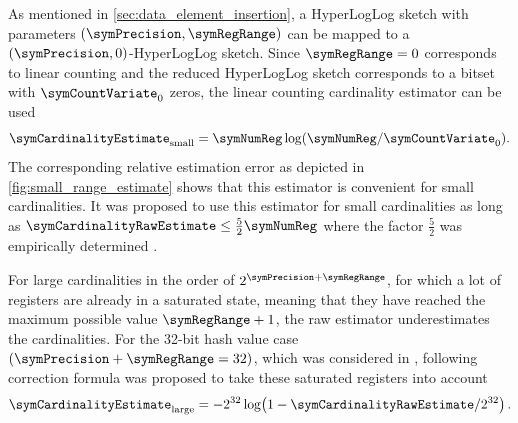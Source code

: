 \documentclass[a4paper]{scrartcl}
\begin{document}
As mentioned in \cref{sec:data_element_insertion}, a HyperLogLog sketch with parameters $(\symPrecision, \symRegRange)$ can be mapped to a $(\symPrecision, 0)$-HyperLogLog sketch. Since $\symRegRange=0$ corresponds to linear counting and the reduced HyperLogLog sketch corresponds to a bitset with $\symCountVariate_0$ zeros, the linear counting cardinality estimator \cite{Whang1990} can be used
\begin{equation}
\label{equ:linear_counting_estimator}
\symCardinalityEstimate_\text{small} = \symNumReg \log(\symNumReg/\symCountVariate_0).
\end{equation}
The corresponding relative estimation error as depicted in \cref{fig:small_range_estimate} shows that this estimator is convenient for small cardinalities. It was proposed to use this estimator for small cardinalities as long as $\symCardinalityRawEstimate \leq \frac{5}{2}\symNumReg$ where the factor $\frac{5}{2}$ was empirically determined \cite{Flajolet2007}. 

For large cardinalities in the order of $2^{\symPrecision+\symRegRange}$, for which a lot of registers are already in a saturated state, meaning that they have reached the maximum possible value $\symRegRange + 1$, the raw estimator underestimates the cardinalities. For the 32-bit hash value case $(\symPrecision+\symRegRange=32)$, which was considered in \cite{Flajolet2007}, following correction formula was proposed to take these saturated registers into account
\begin{equation}
\label{equ:large_range_estimate}
\symCardinalityEstimate_\text{large}
=
-2^{32}\log\!\left(1-\symCardinalityRawEstimate/2^{32}\right).
\end{equation}
\end{document}
